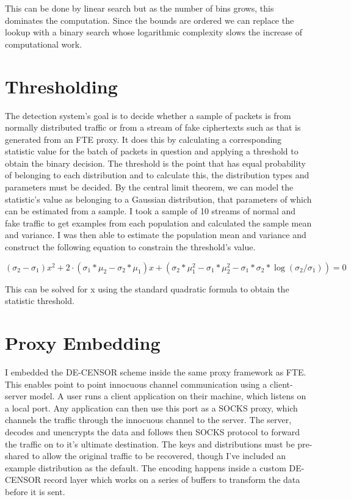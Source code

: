 \documentclass[ %
                    author={Samuel Russell},
                supervisor={Prof. Bogdan Warinschi},
                    degree={MEng},
                     title={Innocuous Ciphertexts},
                  subtitle={The DE-CENSOR Scheme},
                      type={research},
                      year={2018} ]{dissertation}
\begin{document}
This can be done by linear search but as the number of bins grows, this dominates the computation.
Since the bounds are ordered we can replace the lookup with a binary search whose logarithmic complexity slows the increase of computational work.

\section{Thresholding}\label{sec:thresholding}

The detection system's goal is to decide whether a sample of packets is from normally distributed traffic or from a stream of fake ciphertexts such as that is generated from an FTE proxy.
It does this by calculating a corresponding statistic value for the batch of packets in question and applying a threshold to obtain the binary decision.
The threshold is the point that has equal probability of belonging to each distribution and to calculate this, the distribution types and parameters must be decided.
By the central limit theorem, we can model the statistic's value as belonging to a Gaussian distribution, that parameters of which can be estimated from a sample.
I took a sample of 10 streams of normal and fake traffic to get examples from each population and calculated the sample mean and variance. I was then able to estimate the population mean and variance and construct the following equation to constrain the threshold's value.

$$(\sigma_2-\sigma_1) x^2 + 2\cdot (\sigma_1*\mu_2 - \sigma_2*\mu_1) x +  (\sigma_2*\mu_1^2 - \sigma_1*\mu_2^2 - \sigma_1*\sigma_2*\log(\sigma_2/\sigma_1)) = 0$$

This can be solved for x using the standard quadratic formula to obtain the statistic threshold.

\section{Proxy Embedding}

I embedded the DE-CENSOR scheme inside the same proxy framework as FTE.
This enables point to point innocuous channel communication using a client-server model.
A user runs a client application on their machine, which listens on a local port.
Any application can then use this port as a SOCKS proxy, which channels the traffic through the innocuous channel to the server.
The server, decodes and unencrypts the data and follows then SOCKS protocol to forward the traffic on to it's ultimate destination.
The keys and distributions must be pre-shared to allow the original traffic to be recovered, though I've included an example distribution as the default.
The encoding happens inside a custom DE-CENSOR record layer which works on a series of buffers to transform the data before it is sent.
\end{document}

